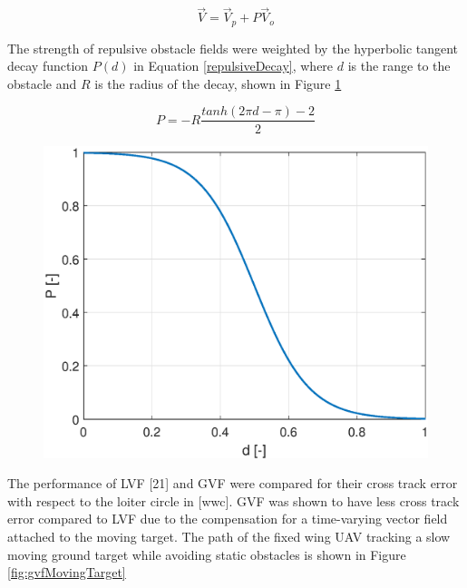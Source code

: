 \documentclass[numbered,pdftex]{ohio-etd}
\begin{document}
 
 \begin{equation}
 \overrightarrow{V} = \overrightarrow{V}_{p}+P\overrightarrow{V}_{o}
 \label{summedAttRepulsive}
 \end{equation}
 
 \noindent
 The strength of repulsive obstacle fields were weighted by the hyperbolic tangent decay function $P(d)$ in Equation \ref{repulsiveDecay}, where $d$ is the range to the obstacle and $R$ is the radius of the decay, shown in Figure \ref{fig:tanhLit}
 
 \begin{equation}
 P = -R\frac{tanh(2\pi d-\pi)-2}{2}
 \label{repulsiveDecay}
 \end{equation}

\begin{figure}[H]
	\centering
	\includegraphics[width=12cm]{PaperFigures/Literature/tanh}
	\caption{}
	\label{fig:tanhLit}
\end{figure}

 
 \noindent
 The performance of LVF [21] and GVF \cite{goncalves_artificial_2009,goncalves_circulation_2010,goncalves_vector_2010} were compared for their cross track error with respect to the loiter circle in [wwc]. GVF was shown to have less cross track error compared to LVF due to the compensation for a time-varying vector field attached to the moving target. The path of the fixed wing UAV tracking a slow moving ground target while avoiding static obstacles is shown in Figure \ref{fig:gvfMovingTarget}
\end{document}

